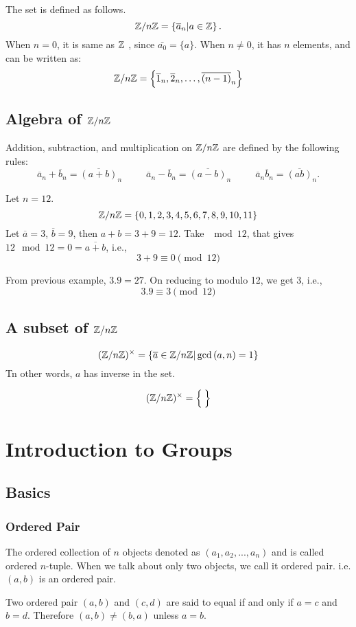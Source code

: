The set is defined as follows.
\[\mathbb Z/n\mathbb Z =\left\{{\overline {a}}_{n}|a\in \mathbb Z\right\}.\]
When $n=0$, it is same as $\mathbb Z$ , since $\bar{a_0} = \{a\}$. 
When $n \neq 0$, it  has $n$ elements, and can be written as:
\[\mathbb Z/n\mathbb Z = \left\{{\overline {1}}_{n},{\overline {2}}_{n},\ldots ,{\overline {(n-1)}}_{n}\right\}\]
\section{Algebra of $\mathbb Z/n\mathbb Z$}
Addition, subtraction, and multiplication on $\mathbb Z/n\mathbb Z$ are defined by the following rules:
\[
{\overline {a}}_{n}+{\overline {b}}_{n}={\overline {(a+b)}}_{n} \,\,\,\,\,\,\,\,\,\,\,\,\,\,\,
{\overline {a}}_{n}-{\overline {b}}_{n}={\overline {(a-b)}}_{n}\,\,\,\,\,\,\,\,\,\,\,\,\,\,\,
{\overline {a}}_{n}{\overline {b}}_{n}={\overline {(ab)}}_{n}.
\]
\begin{ex}
	Let $n=12$.
	\[\mathbb Z/n\mathbb Z = \left\{0,1,2,3,4,5,6,7,8,9,10,11\right\}\]
Let $\overline{a}=3$, $\overline{b}=9$, then $a+b = 3+9 = 12$. Take $\mod 12$, that gives $12\mod 12 = 0 = \overline{a+b}$, i.e.,
\[3+9 \equiv 0 \pmod{12}\]
\end{ex}
\begin{ex}
	From previous example,
	$3.9 = 27$. On reducing to modulo 12, we get 3, i.e.,
	\[3.9 \equiv 3 \pmod{12}\]
\end{ex}
\section{A subset of $\mathbb Z/n\mathbb Z$}
\[(\mathbb Z/n\mathbb Z)^{\times} = \left\{\overline{a}\in \mathbb Z/n\mathbb Z | \gcd{(a,n)} =1\right\}\]
Tn other words, $a$ has inverse in the set.
\begin{ex}
 \[(\mathbb Z/n\mathbb Z)^{\times} = \left\{\over\right\}\]
\end{ex}
\chapter{Introduction to Groups}
\section{Basics}
\subsection{Ordered Pair}
The ordered collection of $n$ objects denoted as $(a_1,a_2, ...,a_n)$ and is called ordered $n$-tuple. When we talk about only two objects, we call it ordered pair. i.e. $(a,b)$ is an ordered pair.

Two ordered pair $(a,b)$ and $(c,d)$ are said to equal if and only if $a=c$ and $b=d$. Therefore $(a,b) \neq (b,a)$ unless $a=b$.

